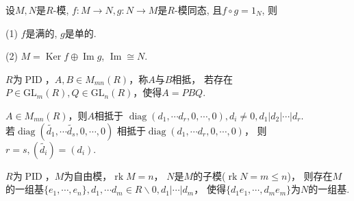     \begin{lemma}
        设$M,N$是$R$-模, $f:M\rightarrow N, g:N\rightarrow M$是$R$-模同态, 且$f\circ g=1_N$, 则\par
        \qquad (1) $f$是满的, $g$是单的.\par
        \qquad (2) $M=\operatorname{Ker} f\oplus \operatorname{Im} g$, $\operatorname{Im}\cong N$.
    \end{lemma}
    \begin{definition}
        $R$为$\operatorname{PID}$，$A,B\in M_{mn}(R)$，称$A$与$B$相抵，
        若存在$P\in \mathrm{GL}_m(R),Q\in \mathrm{GL}_n(R)$，使得$A=PBQ$.
    \end{definition}
    \begin{theorem}
        $A\in M_{mn}(R)$，则$A$相抵于
        $\operatorname{diag}(d_1,\cdots d_r,0,\cdots,0),d_i\neq0,d_1\vert d_2\vert\cdots \vert d_r.$\\
        若$\operatorname{diag}(\widetilde{d_1},\cdots \widetilde{d_s},0,\cdots,0)$
        相抵于$\operatorname{diag}(d_1,\cdots d_r,0,\cdots,0)$，
        则$r=s,(\widetilde{d_i})=(d_i).$
    \end{theorem}
    \begin{corollary}
        $R$为$\operatorname{PID}$，$M$为自由模，$\operatorname{rk}M=n$，
        $N$是$M$的子模($\operatorname{rk}N=m\leq n$)，
        则存在$M$的一组基$\{ e_1,\cdots,e_n\},d_1,\cdots d_m\in R\backslash {0},d_1\vert \cdots \vert d_m$，
        使得$\{d_1e_1,\cdots,d_me_m\}$为$N$的一组基.
    \end{corollary}
    
